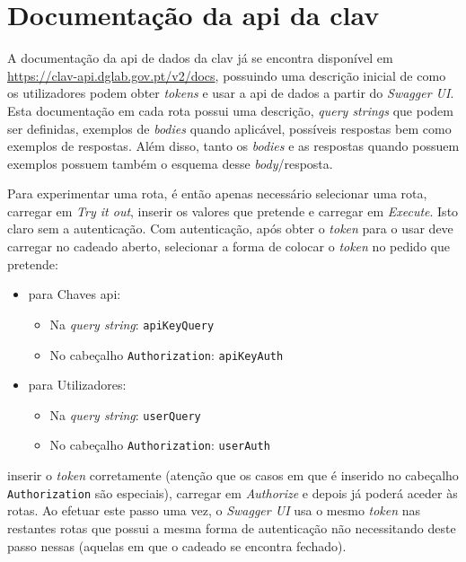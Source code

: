 \section{Documentação da \acrshort{api} da \acrshort{clav}}

A documentação da \acrshort{api} de dados da \acrshort{clav} já se encontra disponível em \url{https://clav-api.dglab.gov.pt/v2/docs}, possuindo uma descrição inicial de como os utilizadores podem obter \textit{tokens} e usar a \acrshort{api} de dados a partir do \textit{Swagger UI}. Esta documentação em cada rota possui uma descrição, \textit{query strings} que podem ser definidas, exemplos de \textit{bodies} quando aplicável, possíveis respostas bem como exemplos de respostas. Além disso, tanto os \textit{bodies} e as respostas quando possuem exemplos possuem também o esquema desse \textit{body}/resposta.

Para experimentar uma rota, é então apenas necessário selecionar uma rota, carregar em \textit{Try it out}, inserir os valores que pretende e carregar em \textit{Execute}. Isto claro sem a autenticação. Com autenticação, após obter o \textit{token} para o usar deve carregar no cadeado aberto, selecionar a forma de colocar o \textit{token} no pedido que pretende: 
\begin{itemize}
    \item para Chaves \acrshort{api}:
    \begin{itemize}
        \item Na \textit{query string}: \texttt{apiKeyQuery}
        \item No cabeçalho \texttt{Authorization}: \texttt{apiKeyAuth}
    \end{itemize}
    \item para Utilizadores:
    \begin{itemize}
        \item Na \textit{query string}: \texttt{userQuery}
        \item No cabeçalho \texttt{Authorization}: \texttt{userAuth}
    \end{itemize}
\end{itemize}
inserir o \textit{token} corretamente (atenção que os casos em que é inserido no cabeçalho \texttt{Authorization} são especiais), carregar em \textit{Authorize} e depois já poderá aceder às rotas. Ao efetuar este passo uma vez, o \textit{Swagger UI} usa o mesmo \textit{token} nas restantes rotas que possui a mesma forma de autenticação não necessitando deste passo nessas (aquelas em que o cadeado se encontra fechado).

